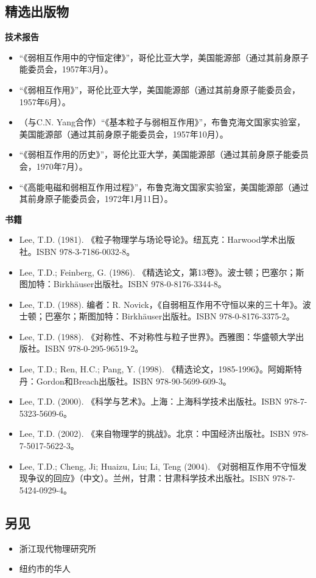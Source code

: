 \subsection{精选出版物}  
\textbf{技术报告}
\begin{itemize}
\item “《弱相互作用中的守恒定律》”，哥伦比亚大学，美国能源部（通过其前身原子能委员会，1957年3月）。  
\item “《弱相互作用》”，哥伦比亚大学，美国能源部（通过其前身原子能委员会，1957年6月）。  
\item （与C.N. Yang合作）“《基本粒子与弱相互作用》”，布鲁克海文国家实验室，美国能源部（通过其前身原子能委员会，1957年10月）。  
\item “《弱相互作用的历史》”，哥伦比亚大学，美国能源部（通过其前身原子能委员会，1970年7月）。  
\item “《高能电磁和弱相互作用过程》”，布鲁克海文国家实验室，美国能源部（通过其前身原子能委员会，1972年1月11日）。
\end{itemize}
\textbf{书籍}  
\begin{itemize}
\item Lee, T.D. (1981). 《粒子物理学与场论导论》。纽瓦克：Harwood学术出版社。ISBN 978-3-7186-0032-8。  
\item Lee, T.D.; Feinberg, G. (1986). 《精选论文，第13卷》。波士顿；巴塞尔；斯图加特：Birkhäuser出版社。ISBN 978-0-8176-3344-8。  
\item Lee, T.D. (1988). 编者：R. Novick，《自弱相互作用不守恒以来的三十年》。波士顿；巴塞尔；斯图加特：Birkhäuser出版社。ISBN 978-0-8176-3375-2。  
\item Lee, T.D. (1988). 《对称性、不对称性与粒子世界》。西雅图：华盛顿大学出版社。ISBN 978-0-295-96519-2。  
\item Lee, T.D.; Ren, H.C.; Pang, Y. (1998). 《精选论文，1985-1996》。阿姆斯特丹：Gordon和Breach出版社。ISBN 978-90-5699-609-3。  
\item Lee, T.D. (2000). 《科学与艺术》。上海：上海科学技术出版社。ISBN 978-7-5323-5609-6。  
\item Lee, T.D. (2002). 《来自物理学的挑战》。北京：中国经济出版社。ISBN 978-7-5017-5622-3。  
\item Lee, T.D.; Cheng, Ji; Huaizu, Liu; Li, Teng (2004). 《对弱相互作用不守恒发现争议的回应》（中文）。兰州，甘肃：甘肃科学技术出版社。ISBN 978-7-5424-0929-4。
\end{itemize}
\subsection{另见}
\begin{itemize}
\item 浙江现代物理研究所  
\item 纽约市的华人
\end{itemize}